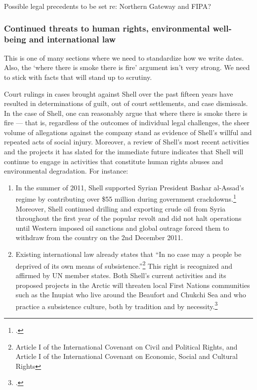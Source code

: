 \begin{vcom}
Possible legal precedents to be set re: Northern Gateway and FIPA?
\end{vcom}


	\subsubsection{Continued threats to human rights, environmental well-being and international law}
	
	
	
\begin{vcom}
This is one of many sections where we need to standardize how we write dates. Also, the `where there is smoke there is fire' argument isn't very strong. We need to stick with facts that will stand up to scrutiny.
\end{vcom}
	
	
	
Court rulings in cases brought against Shell over the past fifteen years have resulted in determinations of guilt, out of court settlements, and case dismissals. 
In the case of Shell, one can reasonably argue that where there is smoke there is fire --- that is, regardless of the outcomes of individual legal challenges, the sheer volume of allegations against the company stand as evidence of Shell's willful and repeated acts of social injury. 
Moreover, a review of Shell's most recent activities and the projects it has slated for the immediate future indicates that Shell will continue to engage in activities that constitute human rights abuses and environmental degradation.
For instance:
\begin{enumerate}
	\item In the summer of 2011, Shell supported Syrian President Bashar al-Assad's regime by contributing over \$55 million during government crackdowns.\footcite[][]{Syria_2011} Moreover, Shell continued drilling and exporting crude oil from Syria throughout the first year of the popular revolt and did not halt operations until Western imposed oil sanctions and global outrage forced them to withdraw from the country on the 2nd December 2011.
	\item Existing international law already states that ``In no case may a people be deprived of its own means of subsistence.''\footnote{Article I of the International Covenant on Civil and Political Rights, and Article I of the International Covenant on Economic, Social and Cultural Rights} This right is recognized and affirmed by UN member states. Both Shell's current activities and its proposed projects in the Arctic will threaten local First Nations communities such as the Inupiat who live around the Beaufort and Chukchi Sea and who practice a subsistence culture, both by tradition and by necessity.\footcite[][p. 13]{RiskingRuin_2012}
\end{enumerate}

